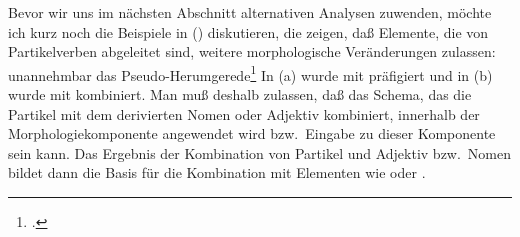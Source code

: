 Bevor wir uns im nächsten Abschnitt alternativen Analysen zuwenden, möchte
ich kurz noch die Beispiele in () diskutieren, die zeigen, daß Elemente, die von Partikelverben
abgeleitet sind, weitere morphologische Veränderungen zulassen:
\eal
\label{pvs-in-morphology}
\ex 
unannehmbar
\ex 
das Pseudo-Herumgerede\footnote{
        .%
    }
\zl
In (a) wurde  mit  präfigiert und in (b) wurde
 mit  kombiniert. Man muß deshalb zulassen,
daß das Schema, das die Partikel mit dem derivierten Nomen oder Adjektiv kombiniert,
innerhalb der Morphologiekomponente angewendet wird bzw.\ Eingabe zu dieser Komponente sein
kann. 
Das Ergebnis der
Kombination von Partikel und Adjektiv bzw.\ Nomen 
bildet dann die Basis für die
Kombination mit Elementen wie  oder .
\begin{comment}
The combination of particle and verbal stem in the morphological component is also needed
for compounds like those in (\mex{1}):\footnote{
        See \citew[\page 55]{Groos89a}\iadata{Groos} for similar Dutch\il{Dutch} examples.
}
\eal
\ex 
\gll Einschreibformular\\
     in.write.form\\
\glt `registration form'
\ex  
\gll Einwickelpapier\\
     in.wrap.paper\\
\glt `wrapping paper'
\zl
\end{comment}
%
%






